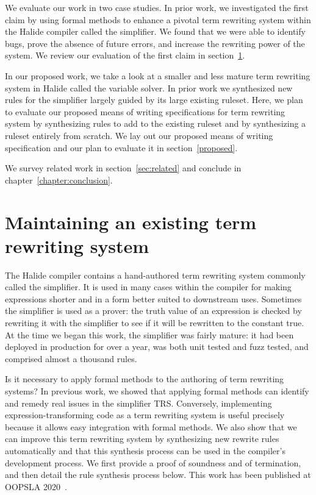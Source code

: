We evaluate our work in two case studies. In prior work, we investigated the first claim by using formal methods to enhance a pivotal term rewriting system within the Halide compiler called the simplifier. We found that we were able to identify bugs, prove the absence of future errors, and increase the rewriting power of the system. We review our evaluation of the first claim in section~\ref{sec:prior}. 

In our proposed work, we take a look at a smaller and less mature term rewriting system in Halide called the variable solver. In prior work we synthesized new rules for the simplifier largely guided by its large existing ruleset. Here, we plan to evaluate our proposed means of writing specifications for term rewriting system by synthesizing rules to add to the existing ruleset and by synthesizing a ruleset entirely from scratch. We lay out our proposed means of writing specification and our plan to evaluate it in section~\ref{proposed}.

We survey related work in section~\ref{sec:related} and conclude in chapter~\ref{chapter:conclusion}.

\section{Maintaining an existing term rewriting system}
\label{sec:prior}

The Halide compiler contains a hand-authored term rewriting system commonly called the simplifier. It is used in many cases within the compiler for making expressions shorter and in a form better suited to downstream uses. Sometimes the simplifier is used as a prover: the truth value of an expression is checked by rewriting it with the simplifier to see if it will be rewritten to the constant true. At the time we began this work, the simplifier was fairly mature: it had been deployed in production for over a year, was both unit tested and fuzz tested, and comprised almost a thousand rules.

Is it necessary to apply formal methods to the authoring of term rewriting systems? In previous work, we showed that applying formal methods can identify and remedy real issues in the simplifier TRS. Conversely, implementing expression-transforming code as a term rewriting system is useful precisely because it allows easy integration with formal methods. We also show that we can improve this term rewriting system by synthesizing new rewrite rules automatically and that this synthesis process can be used in the compiler's development process. We first provide a proof of soundness and of termination, and then detail the rule synthesis process below. This work has been published at OOPSLA 2020~\cite{newcomb2020verifying}.


